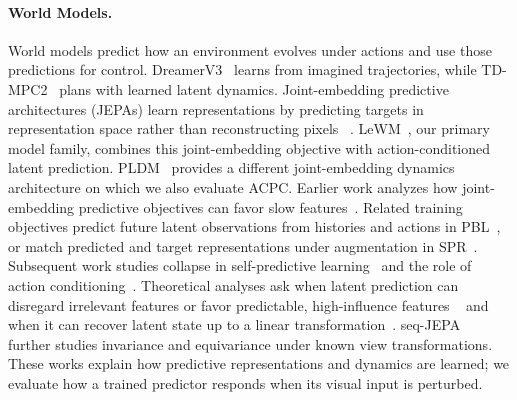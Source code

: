\documentclass[10pt]{article}
\begin{document}
\paragraph{World Models.}
World models predict how an environment evolves under actions and use those
predictions for control. DreamerV3~\cite{hafner2025dreamerv3} learns from
imagined trajectories, while TD-MPC2~\cite{hansen2024tdmpc2} plans with
learned latent dynamics. Joint-embedding predictive architectures (JEPAs)
learn representations by predicting targets in representation space rather
than reconstructing pixels
~\cite{lecun2022path,assran2023ijepa,bardes2024vjepa,assran2025vjepa2}.
LeWM~\cite{maes2026lewm}, our primary model family, combines this
joint-embedding objective with action-conditioned latent prediction.
PLDM~\cite{sobal2025stresstesting}
provides a different joint-embedding dynamics architecture on which we also
evaluate ACPC. Earlier work analyzes how joint-embedding predictive objectives
can favor slow features~\cite{sobal2022jointembeddingpredictivearchitectures}.
Related training objectives predict future latent observations from histories
and actions in PBL~\cite{guo2020pbl}, or match predicted and target
representations under augmentation in SPR~\cite{schwarzer2021spr}.
Subsequent work studies collapse in self-predictive
learning~\cite{tang2023selfpredictive} and the role of action
conditioning~\cite{khetarpal2025actionconditional}. Theoretical analyses ask
when latent prediction can disregard irrelevant features or favor predictable,
high-influence features
~\cite{vanassel2025jointembeddingreconstruction,littwin2024jepaavoidsnoisyfeatures}
and when it can recover latent state up to a linear
transformation~\cite{klindt2026lejepaworldmodel}.
seq-JEPA~\cite{ghaemi2025seqjepa} further studies invariance and equivariance
under known view transformations. These works explain how predictive
representations and dynamics are learned; we evaluate how a trained predictor
responds when its visual input is perturbed.
\end{document}
